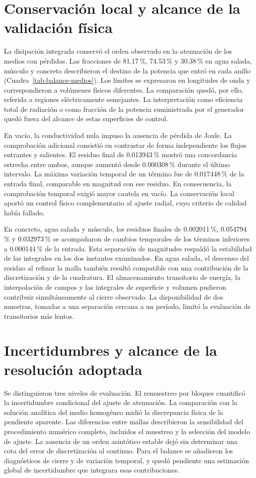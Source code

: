 \section{Conservación local y alcance de la validación física}
La disipación integrada conservó el orden observado en la atenuación de los medios con pérdidas. Las fracciones de 81.17\,\%, 74.53\,\% y 30.38\,\% en agua salada, músculo y concreto describieron el destino de la potencia que entró en cada anillo (Cuadro~\ref{tab:balance-medios}). Los límites se expresaron en longitudes de onda y correspondieron a volúmenes físicos diferentes. La comparación quedó, por ello, referida a regiones eléctricamente semejantes. La interpretación como eficiencia total de radiación o como fracción de la potencia suministrada por el generador quedó fuera del alcance de estas superficies de control.

En vacío, la conductividad nula impuso la ausencia de pérdida de Joule. La comprobación adicional consistió en contrastar de forma independiente los flujos entrantes y salientes. El residuo final de 0.013943\,\% mostró una concordancia estrecha entre ambos, aunque aumentó desde 0.000308\,\% durante el último intervalo. La máxima variación temporal de un término fue de 0.017448\,\% de la entrada final, comparable en magnitud con ese residuo. En consecuencia, la comprobación temporal exigió mayor cautela en vacío. La conservación local aportó un control físico complementario al ajuste radial, cuyo criterio de calidad había fallado.

En concreto, agua salada y músculo, los residuos finales de 0.002011\,\%, 0.054794\,\% y 0.032973\,\% se acompañaron de cambios temporales de los términos inferiores a 0.000144\,\% de la entrada. Esta separación de magnitudes respaldó la estabilidad de las integrales en los dos instantes examinados. En agua salada, el descenso del residuo al refinar la malla también resultó compatible con una contribución de la discretización y de la cuadratura. El almacenamiento transitorio de energía, la interpolación de campos y las integrales de superficie y volumen pudieron contribuir simultáneamente al cierre observado. La disponibilidad de dos muestras, tomadas a una separación cercana a un período, limitó la evaluación de transitorios más lentos.

\section{Incertidumbres y alcance de la resolución adoptada}
Se distinguieron tres niveles de evaluación. El remuestreo por bloques cuantificó la incertidumbre condicional del ajuste de atenuación. La comparación con la solución analítica del medio homogéneo midió la discrepancia física de la pendiente aparente. Las diferencias entre mallas describieron la sensibilidad del procedimiento numérico completo, incluidos el muestreo y la selección del modelo de ajuste. La ausencia de un orden asintótico estable dejó sin determinar una cota del error de discretización al continuo. Para el balance se añadieron los diagnósticos de cierre y de variación temporal, y quedó pendiente una estimación global de incertidumbre que integrara esas contribuciones.

